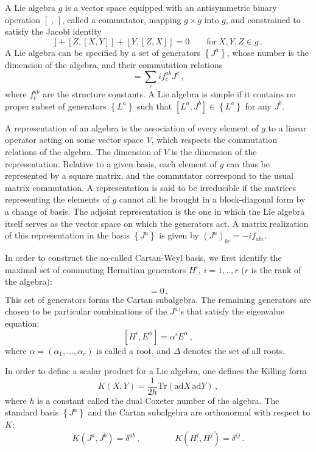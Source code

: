 \documentclass[a4paper,12pt]{report}
\begin{document}
A Lie algebra $g$ is a vector space equipped with an antisymmetric binary operation $[\;,\,]$, called a
commutator, mapping $g\times g$ into $g$, and constrained to satisfy the Jacobi identity
\begin{equation}
[X,[Y,Z]]+[Z,[X,Y]]+[Y,[Z,X]]=0 \qquad \textrm{for} \:X,Y,Z\in g\,.
\end{equation}
A Lie algebra can be specified by a set of generators $\left\{J^{a}\right\}$, whose number is the dimension of the
algebra, and their commutation relations
\begin{equation}
[J^{a},J^{b}]=\sum_{c}if^{ab}_{c}J^{c}\,,
\end{equation}
where $f^{ab}_{c}$ are the structure constants. A Lie algebra is simple if it contains no proper subset of
generators $\left\{L^{a}\right\}$ such that $[L^{a},J^{b}]\in\left\{L^{a}\right\}$ for any $J^{b}$.

A representation of an algebra is the association of every element of $g$ to a linear operator acting on some
vector space $V$, which respects the commutation relations of the algebra. The dimension of $V$ is the dimension
of the representation. Relative to a given basis, each element of $g$ can thus be represented by a square matrix,
and the commutator correspond to the usual matrix commutation. A representation is said to be irreducible if the
matrices representing the elements of $g$ cannot all be brought in a block-diagonal form by a change of basis.
The adjoint representation is the one in which the Lie algebra itself serves as the vector space on which the
generators act. A matrix realization of this representation in the basis $\left\{J^{a}\right\}$ is given by
$\left(J^{a}\right)_{bc}=-if_{abc}$.

In order to construct the so-called Cartan-Weyl basis, we first identify the maximal set of commuting Hermitian
generators $H^{i}$, $i=1,..,r$ ($r$ is the rank of the algebra):
\begin{equation}
[H^{i},H^{j}]=0\,.
\end{equation}
This set of generators forms the Cartan subalgebra. The remaining generators are chosen to be particular
combinations of the $J^{a}$'s that satisfy the eigenvalue equation:
\begin{equation}\label{root}
[H^{i},E^{\alpha}]=\alpha^{i}E^{\alpha}\,,
\end{equation}
where $\alpha=\left(\alpha_{1},...,\alpha_{r}\right)$ is called a root, and $\Delta$ denotes the set of all roots.

In order to define a scalar product for a Lie algebra, one defines the Killing form
\begin{equation}
K(X,Y)=\frac{1}{2h}\textrm{Tr}(\textrm{ad}X\,\textrm{ad}Y)\,,
\end{equation}
where $h$ is a constant called the dual Coxeter number of the algebra. The standard basis $\left\{J^{a}\right\}$
and the Cartan subalgebra are orthonormal with respect to $K$:
\begin{equation}
K\left(J^{a},J^{b}\right)=\delta^{ab}\,, \qquad\qquad K\left(H^{i},H^{j}\right)=\delta^{ij}\,.
\end{equation}
\end{document}
